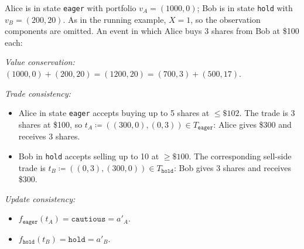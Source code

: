 \documentclass[11pt, one side, article]{memoir}
\theoremstyle{definition}
\theoremstyle{plain}
\newenvironment{example}
  {\pushQED{\qed}\renewcommand{\qedsymbol}{$\lozenge$}\examplex}
  {\popQED\endexamplex}
\newcommand{\0}{\textsf{0}}
\newcommand{\1}{\tn{\textsf{1}}}
\begin{document}
\begin{example}\label{ex:event}
Alice is in state \texttt{eager} with portfolio $v_A = (1000, 0)$; Bob is in state \texttt{hold} with $v_B = (200, 20)$.  As in the running example, $X=1$, so the observation components are omitted.  An event in which Alice buys 3 shares from Bob at \$100 each:

\begin{center}
\end{center}

\noindent\emph{Value conservation:} $(1000,0) + (200,20) = (1200, 20) = (700,3) + (500,17) $.

\noindent\emph{Trade consistency:}
\begin{itemize}[nosep]
\item Alice in state \texttt{eager} accepts buying up to 5 shares at $\leq\$102$.  The trade is 3 shares at \$100, so $t_A\coloneqq((300,0),(0,3)) \in T_{\texttt{eager}}$: Alice gives \$300 and receives 3 shares.
\item Bob in \texttt{hold} accepts selling up to 10 at $\geq\$100$.  The corresponding sell-side trade is $t_B\coloneqq((0,3),(300,0)) \in T_{\texttt{hold}}$: Bob gives 3 shares and receives \$300.
\end{itemize}

\noindent\emph{Update consistency:}
\begin{itemize}[nosep]
\item $f_{\texttt{eager}}(t_A) = \texttt{cautious} = a'_A$.
\item $f_{\texttt{hold}}(t_B) = \texttt{hold} = a'_B$.
\qedhere
\end{itemize}
\end{example}

\end{document}
